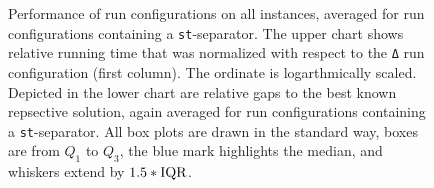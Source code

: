 \begin{figure}
	\centering
	\resizebox{0.95\linewidth}{!}{
	}
	\bigskip
	\caption[Performance of run configurations]{Performance of run configurations on all instances, averaged for run configurations containing a \texttt{st}-separator.
		The upper chart shows relative running time that was normalized with respect to the \texttt{Δ} run configuration (first column).
		The ordinate is logarthmically scaled.
		Depicted in the lower chart are relative gaps to the best known repsective solution, again averaged for run configurations containing a \texttt{st}-separator.
		All box plots are drawn in the standard way, \ie boxes are from $Q_{1}$ to $Q_{3}$, the blue mark highlights the median, and whiskers extend by $1.5*\mathit{\text{IQR}}$.}
	\label{fig:time_and_gap_bars}
\end{figure}

\begin{figure}
	\centering
	\resizebox{0.95\linewidth}{!}{
	}
\end{figure}
\begin{figure}
	\centering
	\resizebox{0.95\linewidth}{!}{
	}
\end{figure}
